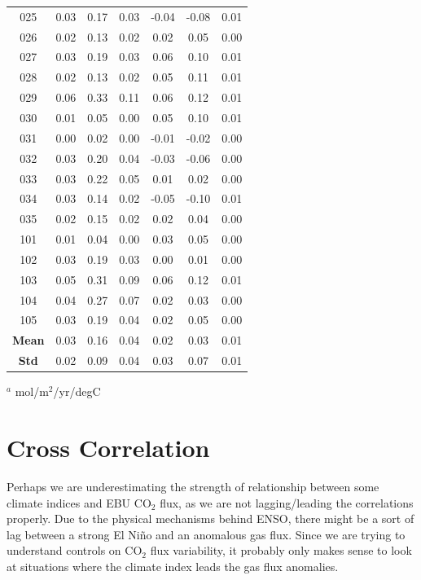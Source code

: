 \documentclass[12pt]{article}
\begin{document}
\begin{table}[!h]
\begin{tabular}{c c c c | c c c}
		025 &   0.03 &     0.17 &       0.03 &  -0.04 &    -0.08 &       0.01 \\
		026 &   0.02 &     0.13 &       0.02 &   0.02 &     0.05 &       0.00 \\
		027 &   0.03 &     0.19 &       0.03 &   0.06 &     0.10 &       0.01 \\
		028 &   0.02 &     0.13 &       0.02 &   0.05 &     0.11 &       0.01 \\
		029 &   0.06 &     0.33 &       0.11 &   0.06 &     0.12 &       0.01 \\
		030 &   0.01 &     0.05 &       0.00 &   0.05 &     0.10 &       0.01 \\
		031 &   0.00 &     0.02 &       0.00 &  -0.01 &    -0.02 &       0.00 \\
		032 &   0.03 &     0.20 &       0.04 &  -0.03 &    -0.06 &       0.00 \\
		033 &   0.03 &     0.22 &       0.05 &   0.01 &     0.02 &       0.00 \\
		034 &   0.03 &     0.14 &       0.02 &  -0.05 &    -0.10 &       0.01 \\
		035 &   0.02 &     0.15 &       0.02 &   0.02 &     0.04 &       0.00 \\
		101 &   0.01 &     0.04 &       0.00 &   0.03 &     0.05 &       0.00 \\
		102 &   0.03 &     0.19 &       0.03 &   0.00 &     0.01 &       0.00 \\
		103 &   0.05 &     0.31 &       0.09 &   0.06 &     0.12 &       0.01 \\
		104 &   0.04 &     0.27 &       0.07 &   0.02 &     0.03 &       0.00 \\
		105 &   0.03 &     0.19 &       0.04 &   0.02 &     0.05 &       0.00 \\
		\bottomrule
		\textbf{Mean} & 0.03 & 0.16 & 0.04 & 0.02 & 0.03 & 0.01 \\
		\textbf{Std} & 0.02 & 0.09 & 0.04 & 0.03 & 0.07 & 0.01
	\end{tabular}
	\begin{tablenotes}
		\centering
		\item $^{a}$ mol/m$^{2}$/yr/degC
	\end{tablenotes}
	\label{tab:pdo-atlantic}
\end{table}

\section{Cross Correlation}
Perhaps we are underestimating the strength of relationship between some climate indices and EBU CO$_{2}$ flux, as we are not lagging/leading the correlations properly. Due to the physical mechanisms behind ENSO, there might be a sort of lag between a strong El Ni\~no and an anomalous gas flux. Since we are trying to understand controls on CO$_{2}$ flux variability, it probably only makes sense to look at situations where the climate index leads the gas flux anomalies. \\
\end{document}
